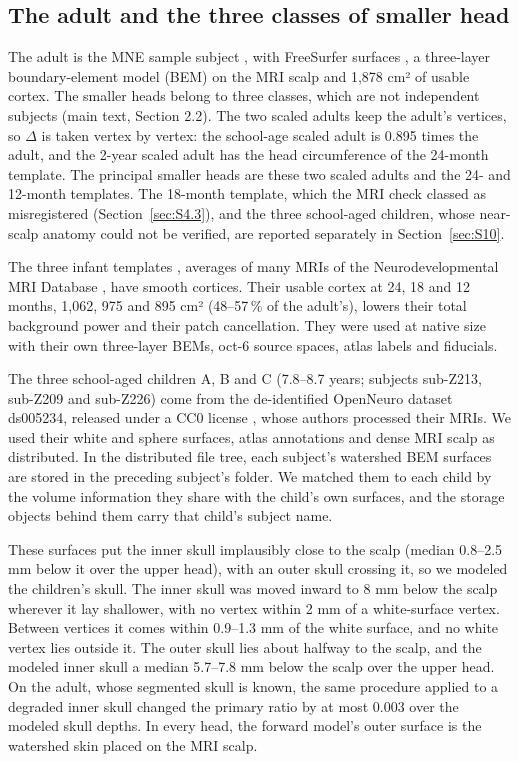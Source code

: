 \documentclass[preprint,12pt,authoryear,a4paper]{elsarticle}
\begin{document}
\subsection{The adult and the three classes of smaller head}\label{sec:S4.1}

The adult is the MNE sample subject \citep{gramfort2013}, with FreeSurfer surfaces \citep{fischl2012}, a three-layer boundary-element model (BEM) on the MRI scalp and 1,878 cm² of usable cortex. The smaller heads belong to three classes, which are not independent subjects (main text, Section 2.2). The two scaled adults keep the adult's vertices, so $\Delta$ is taken vertex by vertex: the school-age scaled adult is 0.895 times the adult, and the 2-year scaled adult has the head circumference of the 24-month template. The principal smaller heads are these two scaled adults and the 24- and 12-month templates. The 18-month template, which the MRI check classed as misregistered (Section~\ref{sec:S4.3}), and the three school-aged children, whose near-scalp anatomy could not be verified, are reported separately in Section~\ref{sec:S10}.

The three infant templates \citep{oreilly2021}, averages of many MRIs of the Neurodevelopmental MRI Database \citep{richards2016}, have smooth cortices. Their usable cortex at 24, 18 and 12 months, 1,062, 975 and 895 cm² (48–57\,\% of the adult's), lowers their total background power and their patch cancellation. They were used at native size with their own three-layer BEMs, oct-6 source spaces, atlas labels and fiducials.

The three school-aged children A, B and C (7.8–8.7 years; subjects sub-Z213, sub-Z209 and sub-Z226) come from the de-identified OpenNeuro dataset ds005234, released under a CC0 license \citep{fadeev2024,fadeev2025}, whose authors processed their MRIs. We used their white and sphere surfaces, atlas annotations and dense MRI scalp as distributed. In the distributed file tree, each subject's watershed BEM surfaces are stored in the preceding subject's folder. We matched them to each child by the volume information they share with the child's own surfaces, and the storage objects behind them carry that child's subject name.

These surfaces put the inner skull implausibly close to the scalp (median 0.8–2.5 mm below it over the upper head), with an outer skull crossing it, so we modeled the children's skull. The inner skull was moved inward to 8 mm below the scalp wherever it lay shallower, with no vertex within 2 mm of a white-surface vertex. Between vertices it comes within 0.9–1.3 mm of the white surface, and no white vertex lies outside it. The outer skull lies about halfway to the scalp, and the modeled inner skull a median 5.7–7.8 mm below the scalp over the upper head. On the adult, whose segmented skull is known, the same procedure applied to a degraded inner skull changed the primary ratio by at most 0.003 over the modeled skull depths. In every head, the forward model's outer surface is the watershed skin placed on the MRI scalp.
\end{document}
